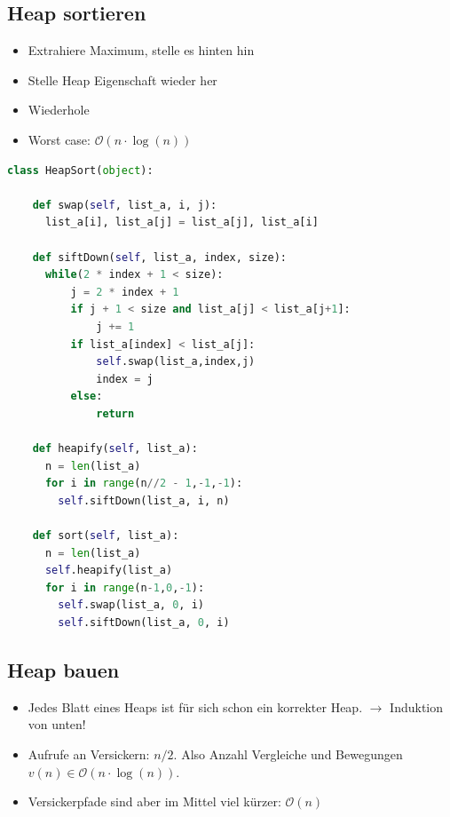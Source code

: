 \begin{sectionbox}
\subsection{Heap sortieren}\smallskip
\begin{itemize}
    \item Extrahiere Maximum, stelle es hinten hin
    \item Stelle Heap Eigenschaft wieder her
    \item Wiederhole
    \item Worst case: $\mathcal{O}(n \cdot \operatorname{log}(n))$
\end{itemize}
\end{sectionbox}

\begin{lstlisting}[language=Python]
class HeapSort(object):

    def swap(self, list_a, i, j):
      list_a[i], list_a[j] = list_a[j], list_a[i]

    def siftDown(self, list_a, index, size):
      while(2 * index + 1 < size):
          j = 2 * index + 1
          if j + 1 < size and list_a[j] < list_a[j+1]:
              j += 1
          if list_a[index] < list_a[j]:
              self.swap(list_a,index,j)
              index = j
          else:
              return

    def heapify(self, list_a):
      n = len(list_a)
      for i in range(n//2 - 1,-1,-1):
        self.siftDown(list_a, i, n)

    def sort(self, list_a):
      n = len(list_a)
      self.heapify(list_a)
      for i in range(n-1,0,-1):
        self.swap(list_a, 0, i)
        self.siftDown(list_a, 0, i)
\end{lstlisting}\vspace{-4px}

\begin{sectionbox}
\subsection{Heap bauen}\smallskip
\begin{itemize}
    \item Jedes Blatt eines Heaps ist für sich schon ein korrekter Heap. $\rightarrow$ Induktion von unten!
    \item Aufrufe an Versickern: $n/2$. Also Anzahl Vergleiche und Bewegungen $v(n) \in \mathcal{O}(n \cdot \operatorname{log}(n))$.
    \item Versickerpfade sind aber im Mittel viel kürzer: $\mathcal{O}(n)$
\end{itemize}
\end{sectionbox}